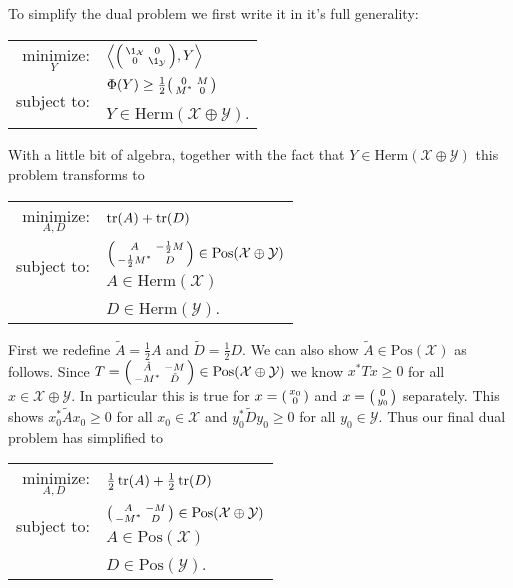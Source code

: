 \documentclass[boxes,pages,color=SeaGreen]{homework}
\newcommand{\X}{\mathcal{X}}
\newcommand{\Y}{\mathcal{Y}}
\newcommand{\Pos}{\mathrm{Pos}}
\newcommand{\Herm}{\mathrm{Herm}}
\begin{document}
\begin{solution}
    To simplify the dual problem we first write it in it's full generality:
    \begin{center}
        \begin{tabular}{rl}
            $\underset{Y}{\text{minimize}}$: & $\left\langle \spmqty{\1_\X        & 0 \\ 0 & \1_\Y}, Y\right\rangle$ \\ \cmidrule(lr{1em}){2-2}
            \multirow{2}{*}{subject to:}     & $\Phi(Y) \geq \frac{1}{2}\spmqty{0 & M \\ M^* & 0}$    \\
                                             & $Y\in\Herm(\X\oplus \Y)$.
        \end{tabular}
    \end{center}
    With a little bit of algebra, together with the fact that $Y\in\Herm(\X\oplus\Y)$ this problem transforms to
    \begin{center}
        \begin{tabular}{rl}
            $\underset{A, D}{\text{minimize}}$: & $\tr(A) + \tr(D)$                 \\ \cmidrule(lr{1em}){2-2}
            \multirow{2}{*}{subject to:}        & $\spmqty{A        & -\frac{1}{2}M \\ -\frac{1}{2}M^* & D}\in\Pos(\X\oplus \Y)$    \\
                                                & $A\in\Herm(\X)$                   \\
                                                & $D\in\Herm(\Y)$.
        \end{tabular}
    \end{center}
    First we redefine $\tilde{A} = \frac{1}{2}A$ and $\tilde{D} = \frac{1}{2}D$.
    We can also show $\tilde{A}\in\Pos(\X)$ as follows.
    Since $T = \smqty(\tilde{A} & - M \\ -M^* & \tilde{D})\in\Pos(\X\oplus\Y)$ we know $x^*Tx\geq 0$ for all $x\in\X\oplus\Y$.
    In particular this is true for $x = \smqty(x_0 \\ 0)$ and $x = \smqty(0 \\ y_0)$ separately.
    This shows $x_0^*\tilde{A}x_0 \geq 0$ for all $x_0\in\X$ and $y_0^*\tilde{D}y_0 \geq 0$ for all $y_0\in\Y$.
    Thus our final dual problem has simplified to
    \begin{center}
        \begin{tabular}{rl}
            $\underset{A, D}{\text{minimize}}$: & $\frac{1}{2}\tr(A) + \frac{1}{2}\tr(D)$      \\ \cmidrule(lr{1em}){2-2}
            \multirow{2}{*}{subject to:}        & $\spmqty{A                              & -M \\ -M^* & D}\in\Pos(\X\oplus \Y)$    \\
                                                & $A\in\Pos(\X)$                               \\
                                                & $D\in\Pos(\Y)$.
        \end{tabular}
    \end{center}


\end{solution}
\end{document}
